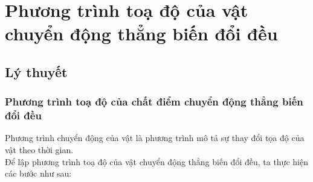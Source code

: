 \let\lesson\undefined
\newcommand{\lesson}{\phantomlesson{Bài 7: Gia tốc. Chuyển động thẳng biến đổi đều}}
\chapter[Phương trình toạ độ của vật chuyển động thẳng biến đổi đều]{Phương trình toạ độ của vật chuyển động thẳng biến đổi đều}
\setcounter{section}{0}
\section{Lý thuyết}
\subsection{Phương trình toạ độ của chất điểm chuyển động thẳng biến đổi đều}
Phương trình chuyển động của vật là phương trình mô tả sự thay đổi tọa độ của vật theo thời gian. \\
Để lập phương trình toạ độ của vật chuyển động thẳng biến đổi đều, ta thực hiện các bước như sau:
